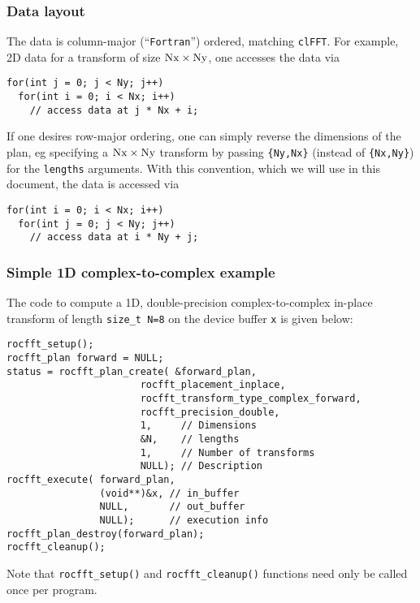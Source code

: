 \documentclass[10pt]{article}
\renewcommand{\(}{\left(}
\renewcommand{\)}{\right)}
\begin{document}
\subsubsection{Data layout}
\label{ssdatalayout}
The data is column-major (``\texttt{Fortran}'') ordered, matching
\texttt{clFFT}.  For example, 2D data for a transform of size
$\text{\lstinline{Nx}}\times\text{\lstinline{Ny}}$, one accesses the
data via
\begin{lstlisting}
for(int j = 0; j < Ny; j++)
  for(int i = 0; i < Nx; i++)
    // access data at j * Nx + i;
\end{lstlisting}
If one desires row-major ordering, one can simply reverse the
dimensions of the plan, eg specifying a
$\text{\lstinline{Nx}}\times\text{\lstinline{Ny}}$ transform by
passing \lstinline|{Ny,Nx}| (instead of \lstinline|{Nx,Ny}|) for the
\lstinline|lengths| arguments.  With this convention, which we will
use in this document, the data is accessed via 
\begin{lstlisting}
for(int i = 0; i < Nx; i++)
  for(int j = 0; j < Ny; j++)
    // access data at i * Ny + j;
\end{lstlisting}

\subsubsection{Simple 1D complex-to-complex example}
The code to compute a 1D, double-precision complex-to-complex in-place
transform of length \lstinline{size_t N=8} on the device buffer
\lstinline{x} is given below:
\begin{lstlisting}
rocfft_setup();
rocfft_plan forward = NULL;
status = rocfft_plan_create( &forward_plan,
                       rocfft_placement_inplace,
                       rocfft_transform_type_complex_forward,
                       rocfft_precision_double,
                       1,     // Dimensions
                       &N,    // lengths
                       1,     // Number of transforms
                       NULL); // Description
rocfft_execute( forward_plan,
                (void**)&x, // in_buffer
                NULL,       // out_buffer
                NULL);      // execution info
rocfft_plan_destroy(forward_plan);
rocfft_cleanup();
\end{lstlisting}
Note that \lstinline{rocfft_setup()} and \lstinline{rocfft_cleanup()}
functions need only be called once per program.
\end{document}
